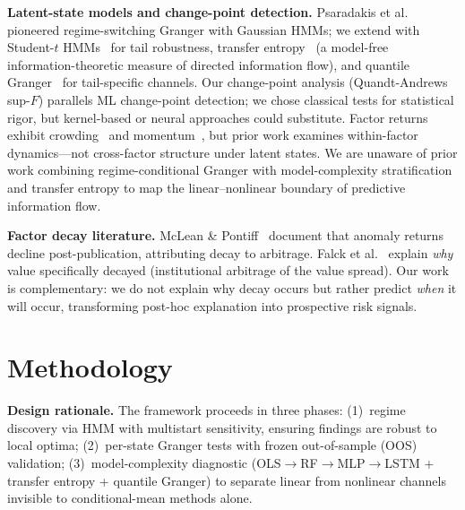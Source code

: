 \documentclass[sigconf,anonymous]{acmart}
\begin{document}
\textbf{Latent-state models and change-point detection.}
Psaradakis et al.~\cite{psaradakis2005markov} pioneered regime-switching
Granger with Gaussian HMMs; we extend with Student-$t$
HMMs~\cite{bulla2011hidden} for tail robustness,
transfer entropy~\cite{schreiber2000measuring} (a model-free
information-theoretic measure of directed information flow),
and quantile Granger~\cite{troster2019testing} for tail-specific
channels. Our change-point analysis (Quandt-Andrews sup-$F$) parallels
ML change-point detection; we chose classical tests for statistical
rigor, but kernel-based or neural approaches could substitute.
Factor returns exhibit crowding~\cite{marks2019factor}
and momentum~\cite{ehsani2022factor}, but prior work examines
within-factor dynamics---not cross-factor structure under latent states.
We are unaware of prior work combining regime-conditional Granger
with model-complexity stratification and transfer entropy to map the
linear--nonlinear boundary of predictive information flow.

\textbf{Factor decay literature.}
McLean \& Pontiff~\cite{mclean2016does} document that anomaly returns
decline post-publication, attributing decay to arbitrage.
Falck et al.~\cite{falck2021value} explain \emph{why} value specifically
decayed (institutional arbitrage of the value spread). Our work is
complementary: we do not explain why decay occurs but rather predict
\emph{when} it will occur, transforming post-hoc explanation into
prospective risk signals.

\section{Methodology}

\textbf{Design rationale.} The framework proceeds in three phases:
(1)~regime discovery via HMM with multistart sensitivity, ensuring
findings are robust to local optima; (2)~per-state Granger tests
with frozen out-of-sample (OOS) validation; (3)~model-complexity diagnostic
(OLS$\to$RF$\to$MLP$\to$LSTM + transfer entropy + quantile Granger)
to separate linear from nonlinear channels invisible to
conditional-mean methods alone.
\end{document}

